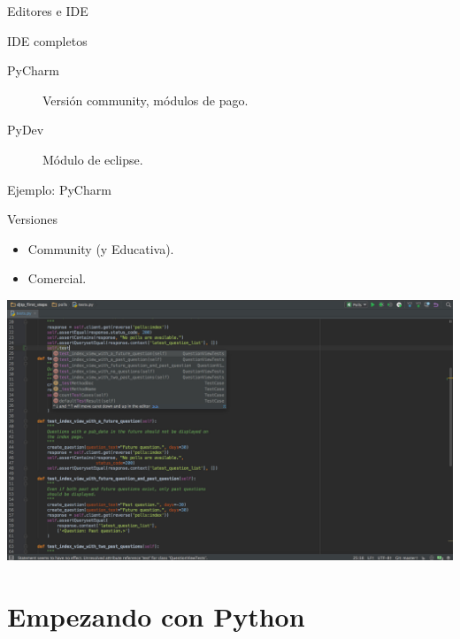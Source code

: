 \documentclass[bigger,unknownkeysallowed]{beamer}
\begin{document}
\begin{frame}[label={sec:orgb5d527d}]{Editores e IDE}
\begin{block}{IDE completos}
\begin{description}
\item[{PyCharm}] Versión community, módulos de pago.
\item[{PyDev}] Módulo de eclipse.
\end{description}
\end{block}
\end{frame}


\begin{frame}[label={sec:org1b7c778}]{Ejemplo: PyCharm}
\begin{block}{Versiones}
\begin{itemize}
\item Community (y Educativa).
\item Comercial.
\end{itemize}
\end{block}

\begin{center}
\begin{center}
\includegraphics[width=.8\textwidth]{pycharm.png}
\end{center}
\end{center}
\end{frame}

\section{Empezando con Python}
\label{sec:orgc90a203}
\end{document}

